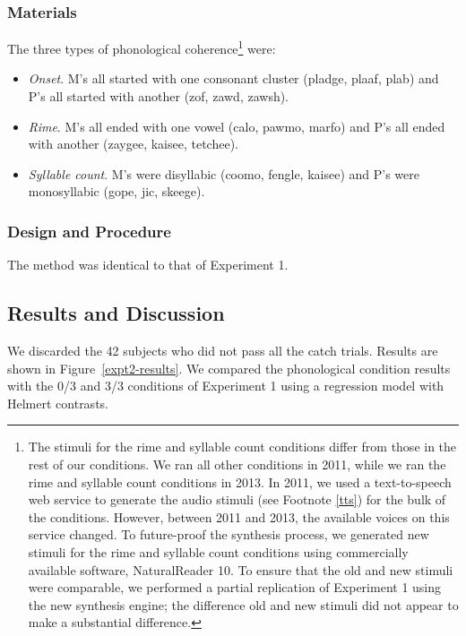 \documentclass[man,floatsintext]{apa6}
\begin{document}
\subsubsection{Materials}
The three types of phonological coherence\footnote{\label{change-of-stimuli} The stimuli for the rime and syllable count conditions differ from those in the rest of our conditions. We ran all other conditions in 2011, while we ran the rime and syllable count conditions in 2013. In 2011, we used a text-to-speech web service to generate the audio stimuli (see Footnote \ref{tts}) for the bulk of the conditions. However, between 2011 and 2013, the available voices on this service changed. To future-proof the synthesis process, we generated new stimuli for the rime and syllable count conditions using commercially available software, NaturalReader 10. To ensure that the old and new stimuli were comparable, we performed a partial replication of Experiment 1 using the new synthesis engine; the difference old and new stimuli did not appear to make a substantial difference.} were:
\begin{itemize}
\item \emph{Onset}. M's all started with one consonant cluster (pladge, plaaf, plab) and P's all started with another (zof, zawd, zawsh).
\item \emph{Rime}. M's all ended with one vowel (calo, pawmo, marfo) and P's all ended with another (zaygee, kaisee, tetchee).
\item \emph{Syllable count}. M's were disyllabic (coomo, fengle, kaisee) and P's were monosyllabic (gope, jic, skeege).
\end{itemize} 



\subsubsection{Design and Procedure} The method was identical to that of Experiment 1.

\subsection{Results and Discussion}

We discarded the 42 subjects who did not pass all the catch trials. Results are shown in Figure~\ref{expt2-results}. We compared the phonological condition results with the 0/3 and 3/3 conditions of Experiment 1 using a regression model with Helmert contrasts.%
\end{document}
